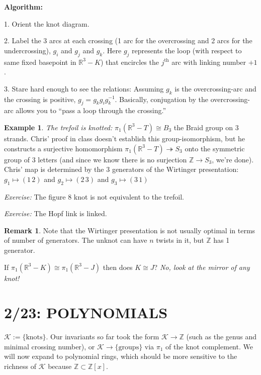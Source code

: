 \documentclass[11pt]{article}
\newcommand{\Z}{\mathbb{Z}}
\newcommand{\R}{\mathbb{R}}
\theoremstyle{plain}
\theoremstyle{definition}
\newtheorem{remark}{Remark}
\newtheorem{ex}{Example}
\begin{document}
\bigskip
\noindent\textbf{Algorithm:}

1. Orient the knot diagram.

2. Label the 3 arcs at each crossing (1 arc for the overcrossing and 2 arcs for the undercrossing), $g_i$ and $g_j$ and $g_k$. Here $g_j$ represents the loop (with respect to same fixed basepoint in $\R^3-K$) that encircles the $j^\text{th}$ arc with linking number $+1$.

3. Stare hard enough to see the relations: Assuming $g_k$ is the overcrossing-arc and the crossing is positive, $g_j=g_kg_ig_k^{-1}$. Basically, conjugation by the overcrossing-arc allows you to ``pass a loop through the crossing.''

\begin{ex}
\textit{The trefoil is knotted:} $\pi_1(\R^3-T)\cong B_3$ the Braid group on 3 strands. Chris' proof in class doesn't establish this group-isomorphism, but he constructs a surjective homomorphism $\pi_1(\R^3-T)\twoheadrightarrow S_3$ onto the symmetric group of 3 letters (and since we know there is no surjection $\Z\to S_3$, we're done). Chris' map is determined by the 3 generators of the Wirtinger presentation: $g_1\mapsto(1\,2)$ and $g_2\mapsto(2\,3)$ and $g_3\mapsto(3\,1)$
\end{ex}

\textit{Exercise:} The figure 8 knot is not equivalent to the trefoil.

\textit{Exercise:} The Hopf link is linked.

\begin{remark}
Note that the Wirtinger presentation is not usually optimal in terms of number of generators. The unknot can have $n$ twists in it, but $\Z$ has 1 generator.
\end{remark}

If $\pi_1(\R^3-K)\cong \pi_1(\R^3-J)$ then does $K\cong J$? \textit{No, look at the mirror of any knot!}



\clearpage
\section{2/23: POLYNOMIALS}

$\mathcal{K}:=\lbrace\text{knots}\rbrace$. Our invariants so far took the form $\mathcal{K}\to\Z$ (such as the genus and minimal crossing number), or $\mathcal{K}\to\lbrace\text{groups}\rbrace$ via $\pi_1$ of the knot complement. We will now expand to polynomial rings, which should be more sensitive to the richness of $\mathcal{K}$ because $\Z\subset\Z[x]$.
\end{document}
